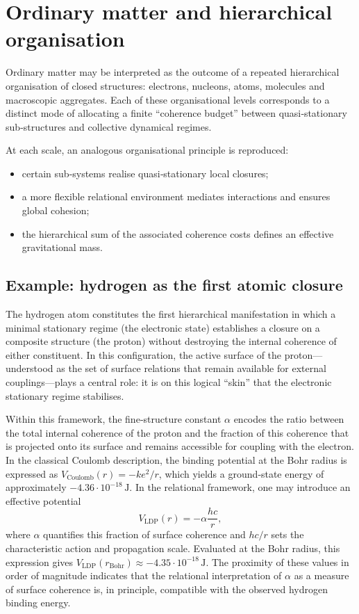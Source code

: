 \documentclass[11pt,a4paper]{article}
\begin{document}
\section{Ordinary matter and hierarchical organisation}
Ordinary matter may be interpreted as the outcome of a repeated hierarchical organisation of closed structures: electrons, nucleons, atoms, molecules and macroscopic aggregates. Each of these organisational levels corresponds to a distinct mode of allocating a finite “coherence budget” between quasi‑stationary sub‑structures and collective dynamical regimes.

At each scale, an analogous organisational principle is reproduced:
\begin{itemize}[label=-]
  \item certain sub‑systems realise quasi‑stationary local closures;
  \item a more flexible relational environment mediates interactions and ensures global cohesion;
  \item the hierarchical sum of the associated coherence costs defines an effective gravitational mass.
\end{itemize}

\subsection*{Example: hydrogen as the first atomic closure}
The hydrogen atom constitutes the first hierarchical manifestation in which a minimal stationary regime (the electronic state) establishes a closure on a composite structure (the proton) without destroying the internal coherence of either constituent. In this configuration, the active surface of the proton—understood as the set of surface relations that remain available for external couplings—plays a central role: it is on this logical “skin” that the electronic stationary regime stabilises.

Within this framework, the fine‑structure constant \(\alpha\) encodes the ratio between the total internal coherence of the proton and the fraction of this coherence that is projected onto its surface and remains accessible for coupling with the electron. In the classical Coulomb description, the binding potential at the Bohr radius is expressed as \(V_{\mathrm{Coulomb}}(r) = -k e^{2}/r\), which yields a ground‑state energy of approximately \(-4.36 \cdot 10^{-18}\,\mathrm{J}\). In the relational framework, one may introduce an effective potential
\[
V_{\mathrm{LDP}}(r) = -\alpha \frac{h c}{r},
\]
where \(\alpha\) quantifies this fraction of surface coherence and \(h c / r\) sets the characteristic action and propagation scale. Evaluated at the Bohr radius, this expression gives \(V_{\mathrm{LDP}}(r_{\mathrm{Bohr}}) \approx -4.35 \cdot 10^{-18}\,\mathrm{J}\). The proximity of these values in order of magnitude indicates that the relational interpretation of \(\alpha\) as a measure of surface coherence is, in principle, compatible with the observed hydrogen binding energy.
\end{document}
